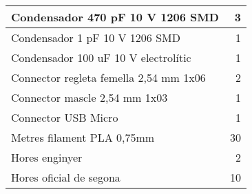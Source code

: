 \begin{table}[H]
\begin{center}
\begin{tabularx} {\textwidth} {|X|r|}
    Condensador 470 pF 10 V 1206 SMD & 3 \\ \hline
    Condensador 1 pF 10 V 1206 SMD & 1 \\ \hline
    Condensador 100 uF 10 V electrolític & 1 \\ \hline
    Connector regleta femella 2,54 mm 1x06 & 2 \\ \hline
    Connector mascle 2,54 mm 1x03 & 1 \\ \hline
    Connector USB Micro & 1 \\ \hline
    Metres filament PLA 0,75mm & 30 \\ \hline
    Hores enginyer & 2 \\ \hline
    Hores oficial de segona & 10 \\ \hline
    \end{tabularx}%
  \end{center}

  \label{tab:addlabel}%
\end{table}%

